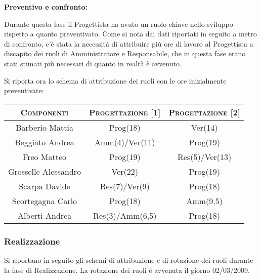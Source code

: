 \documentclass[11pt,a4paper]{article}
\begin{document}
\bigskip \bigskip
\begin{large}\textbf{Preventivo e confronto:}\end{large}
\newline
Durante questa fase il Progettista ha avuto un ruolo chiave nello sviluppo rispetto a quanto preventivato. Come si nota dai dati riportati in seguito a metro di confronto, c'è stata la necessità di attribuire più ore di lavoro al Progettista a discapito dei ruoli di Amministratore e Responsabile, che in questa fase erano stati stimati più necessari di quanto in realtà è avvenuto.

Si riporta ora lo schema di attribuzione dei ruoli con le ore inizialmente preventivate:
\\
\begin{center}
\begin{tabular}{|c||c|c|}
\hline
\textsc{Componenti} & \textsc{Progettazione [1]} & \textsc{Progettazione [2]} \\ \hline \hline
Barberio Mattia & Prog(18) & Ver(14) \\ \hline
Beggiato Andrea & Amm(4)/Ver(11) & Prog(19) \\ \hline
Freo Matteo & Prog(19) & Res(5)/Ver(13) \\ \hline
Grosselle Alessandro & Ver(22) & Prog(19) \\ \hline
Scarpa Davide & Res(7)/Ver(9) & Prog(18) \\ \hline
Scortegagna Carlo & Prog(18) & Amm(9,5) \\ \hline
Alberti Andrea & Res(3)/Amm(6,5) & Prog(18) \\ \hline
\end{tabular}
\end{center}
\bigskip

\subsubsection{Realizzazione}
Si riportano in seguito gli schemi di attribuzione e di rotazione dei ruoli durante la fase di Realizzazione. La rotazione dei ruoli è avvenuta il giorno 02/03/2009.
\end{document}
